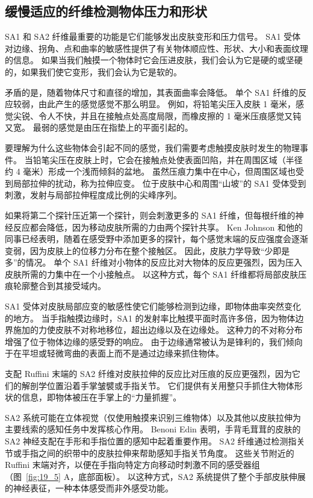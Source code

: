 \subsection{缓慢适应的纤维检测物体压力和形状}

SA1 和 SA2 纤维最重要的功能是它们能够发出皮肤变形和压力信号。
SA1 受体对边缘、拐角、点和曲率的敏感性提供了有关物体顺应性、形状、大小和表面纹理的信息。
如果当我们触摸一个物体时它会压进皮肤，我们会认为它是硬的或坚硬的，如果我们使它变形，我们会认为它是软的。


矛盾的是，随着物体尺寸和直径的增加，其表面曲率会降低。
单个 SA1 纤维的反应较弱，由此产生的感觉感觉不那么明显。
例如，将铅笔尖压入皮肤 1 毫米，感觉尖锐、令人不快，并且在接触点处高度局限，而橡皮擦的 1 毫米压痕感觉又钝又宽。
最弱的感觉是由压在指垫上的平面引起的。


要理解为什么这些物体会引起不同的感觉，我们需要考虑触摸皮肤时发生的物理事件。
当铅笔尖压在皮肤上时，它会在接触点处使表面凹陷，并在周围区域（半径约 4 毫米）形成一个浅而倾斜的盆地。
虽然压痕力集中在中心，但周围区域也受到局部拉伸的扰动，称为拉伸应变。
位于皮肤中心和周围“山坡”的 SA1 受体受到刺激，发射与局部拉伸程度成比例的尖峰序列。


如果将第二个探针压近第一个探针，则会刺激更多的 SA1 纤维，但每根纤维的神经反应都会降低，因为移动皮肤所需的力由两个探针共享。
Ken Johnson 和他的同事已经表明，随着在感受野中添加更多的探针，每个感觉末端的反应强度会逐渐变弱，因为皮肤上的位移力分布在整个接触区。
因此，皮肤力学导致“少即是多”的情况。
单个 SA1 纤维对小物体的反应比对大物体的反应更强烈，因为压入皮肤所需的力集中在一个小接触点。
以这种方式，每个 SA1 纤维都将局部皮肤压痕轮廓整合到其接受域内。


SA1 受体对皮肤局部应变的敏感性使它们能够检测到边缘，即物体曲率突然变化的地方。
当手指触摸边缘时，SA1 的发射率比触摸平面时高许多倍，因为物体边界施加的力使皮肤不对称地移位，超出边缘以及在边缘处。
这种力的不对称分布增强了位于物体边缘的感受野的响应。
由于边缘通常被认为是锋利的，我们倾向于在平坦或轻微弯曲的表面上而不是通过边缘来抓住物体。


支配 Ruffini 末端的 SA2 纤维对皮肤拉伸的反应比对压痕的反应更强烈，因为它们的解剖学位置沿着手掌皱襞或手指关节。
它们提供有关用整只手抓住大物体形状的信息，即物体被压在手掌上的“力量抓握”。


SA2 系统可能在立体视觉（仅使用触摸来识别三维物体）以及其他以皮肤拉伸为主要线索的感知任务中发挥核心作用。
Benoni Edin 表明，手背毛茸茸的皮肤的 SA2 神经支配在手形和手指位置的感知中起着重要作用。
SA2 纤维通过检测指关节或手指之间的织带中的皮肤拉伸来帮助感知手指关节角度。
这些关节附近的 Ruffini 末端对齐，以便在手指向特定方向移动时刺激不同的感受器组（图~\ref{fig:19_5} A，底部面板）。
以这种方式，SA2 系统提供了整个手部皮肤伸展的神经表征，一种本体感受而非外感受功能。


